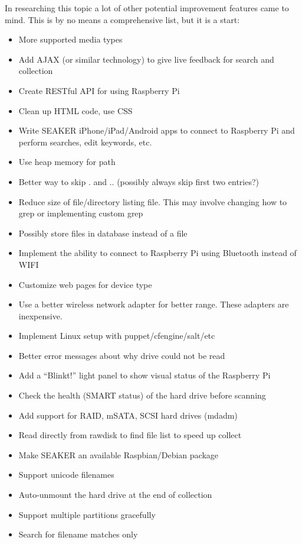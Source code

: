 \documentclass[12pt]{article}
\begin{document}
In researching this topic a lot of other potential improvement features
came to mind.  This is by no means a comprehensive list, but it is a start:

\begin{itemize}
  \item More supported media types
  \item Add AJAX (or similar technology) to give live feedback for search and collection
  \item Create RESTful API for using Raspberry Pi
  \item Clean up HTML code, use CSS
  \item Write SEAKER iPhone/iPad/Android apps to connect to Raspberry Pi and perform searches, edit keywords, etc.
  \item Use heap memory for path
  \item Better way to skip . and .. (possibly always skip first two entries?)
  \item Reduce size of file/directory listing file. This may involve changing how to grep or implementing custom grep
  \item Possibly store files in database instead of a file
  \item Implement the ability to connect to Raspberry Pi using Bluetooth instead of WIFI
  \item Customize web pages for device type
  \item Use a better wireless network adapter for better range. These adapters are inexpensive.
  \item Implement Linux setup with puppet/cfengine/salt/etc
  \item Better error messages about why drive could not be read
  \item Add a “Blinkt!” light panel to show visual status of the Raspberry Pi
  \item Check the health (SMART status) of the hard drive before scanning
  \item Add support for RAID, mSATA, SCSI hard drives (mdadm)
  \item Read directly from rawdisk to find file list to speed up collect
  \item Make SEAKER an available Raspbian/Debian package
  \item Support unicode filenames
  \item Auto-unmount the hard drive at the end of collection
  \item Support multiple partitions gracefully
  \item Search for filename matches only

\end{itemize}
\end{document}
